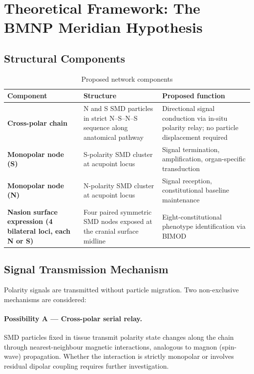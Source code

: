 \documentclass[12pt,a4paper]{article}
\begin{document}
\section{Theoretical Framework: The BMNP Meridian Hypothesis}

\subsection{Structural Components}

\begin{table}[h]
\centering
\caption{Proposed network components}
\begin{tabular}{>{\bfseries}p{3.2cm} p{5.5cm} p{5.5cm}}
\toprule
Component & Structure & Proposed function \\
\midrule
Cross-polar chain &
  N and S SMD particles in strict N--S--N--S sequence along
  anatomical pathway &
  Directional signal conduction via in-situ polarity relay;
  no particle displacement required \\[4pt]
Monopolar node (S) &
  S-polarity SMD cluster at acupoint locus &
  Signal termination, amplification, organ-specific transduction \\[4pt]
Monopolar node (N) &
  N-polarity SMD cluster at acupoint locus &
  Signal reception, constitutional baseline maintenance \\[4pt]
Nasion surface expression (4 bilateral loci, each N or S) &
  Four paired symmetric SMD nodes exposed at the cranial surface
  midline &
  Eight-constitutional phenotype identification via BIMOD \\
\bottomrule
\end{tabular}
\end{table}

\subsection{Signal Transmission Mechanism}
Polarity signals are transmitted without particle migration.
Two non-exclusive mechanisms are considered:

\paragraph{Possibility A --- Cross-polar serial relay.}
SMD particles fixed in tissue transmit polarity state changes along the
chain through nearest-neighbour magnetic interactions, analogous to
magnon (spin-wave) propagation.  Whether the interaction is strictly
monopolar or involves residual dipolar coupling requires further
investigation.
\end{document}
